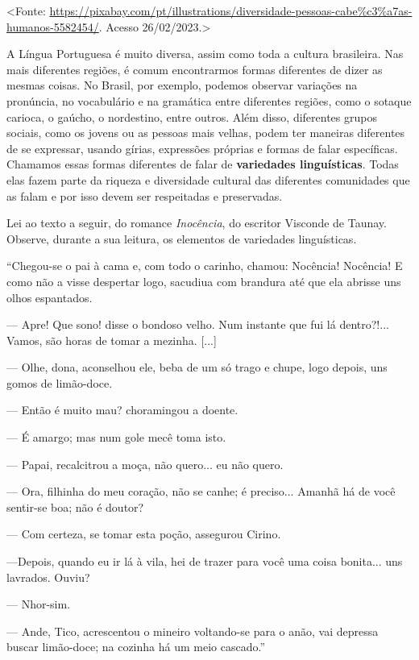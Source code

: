 \textless{}Fonte:
\url{https://pixabay.com/pt/illustrations/diversidade-pessoas-cabe\%c3\%a7as-humanos-5582454/}.
Acesso 26/02/2023.\textgreater{}

A Língua Portuguesa é muito diversa, assim como toda a cultura
brasileira. Nas mais diferentes regiões, é comum encontrarmos formas
diferentes de dizer as mesmas coisas. No Brasil, por exemplo, podemos
observar variações na pronúncia, no vocabulário e na gramática entre
diferentes regiões, como o sotaque carioca, o gaúcho, o nordestino,
entre outros. Além disso, diferentes grupos sociais, como os jovens ou
as pessoas mais velhas, podem ter maneiras diferentes de se expressar,
usando gírias, expressões próprias e formas de falar específicas.
Chamamos essas formas diferentes de falar de \textbf{variedades
linguísticas}. Todas elas fazem parte da riqueza e diversidade cultural
das diferentes comunidades que as falam e por isso devem ser respeitadas
e preservadas.

Lei ao texto a seguir, do romance \emph{Inocência}, do escritor Visconde
de Taunay. Observe, durante a sua leitura, os elementos de variedades
linguísticas.

``Chegou-se o pai à cama e, com todo o carinho, chamou: Nocência!
Nocência! E como não a visse despertar logo, sacudiua com brandura até
que ela abrisse uns olhos espantados.

--- Apre! Que sono! disse o bondoso velho. Num instante que fui lá
dentro?!... Vamos, são horas de tomar a mezinha. {[}...{]}

--- Olhe, dona, aconselhou ele, beba de um só trago e chupe, logo
depois, uns gomos de limão-doce.

--- Então é muito mau? choramingou a doente.

--- É amargo; mas num gole mecê toma isto.

--- Papai, recalcitrou a moça, não quero... eu não quero.

--- Ora, filhinha do meu coração, não se canhe; é preciso... Amanhã há
de você sentir-se boa; não é doutor?

--- Com certeza, se tomar esta poção, assegurou Cirino.

---Depois, quando eu ir lá à vila, hei de trazer para você uma coisa
bonita... uns lavrados. Ouviu?

--- Nhor-sim.

--- Ande, Tico, acrescentou o mineiro voltando-se para o anão, vai
depressa buscar limão-doce; na cozinha há um meio cascado.''


